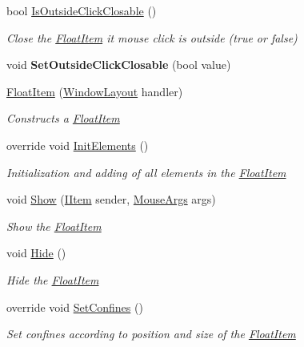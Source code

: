\begin{DoxyCompactItemize}
\item 
bool \mbox{\hyperlink{class_space_v_i_l_1_1_float_item_a491aaaddc768c4676ecfb5c7405ec167}{Is\+Outside\+Click\+Closable}} ()
\begin{DoxyCompactList}\small\item\em Close the \mbox{\hyperlink{class_space_v_i_l_1_1_float_item}{Float\+Item}} it mouse click is outside (true or false) \end{DoxyCompactList}\item 
\mbox{\label{class_space_v_i_l_1_1_float_item_a1e7c8a8d2ba5875d5bc9713a35ea4d36}} 
void {\bfseries Set\+Outside\+Click\+Closable} (bool value)
\item 
\mbox{\hyperlink{class_space_v_i_l_1_1_float_item_af80858fea5cd334aeea694ad34f9e9e6}{Float\+Item}} (\mbox{\hyperlink{class_space_v_i_l_1_1_window_layout}{Window\+Layout}} handler)
\begin{DoxyCompactList}\small\item\em Constructs a \mbox{\hyperlink{class_space_v_i_l_1_1_float_item}{Float\+Item}} \end{DoxyCompactList}\item 
override void \mbox{\hyperlink{class_space_v_i_l_1_1_float_item_adf2e88b89c3ce9ec105fae8ac66390e4}{Init\+Elements}} ()
\begin{DoxyCompactList}\small\item\em Initialization and adding of all elements in the \mbox{\hyperlink{class_space_v_i_l_1_1_float_item}{Float\+Item}} \end{DoxyCompactList}\item 
void \mbox{\hyperlink{class_space_v_i_l_1_1_float_item_a7b352daad024029b2816939c0736aa66}{Show}} (\mbox{\hyperlink{interface_space_v_i_l_1_1_core_1_1_i_item}{I\+Item}} sender, \mbox{\hyperlink{class_space_v_i_l_1_1_core_1_1_mouse_args}{Mouse\+Args}} args)
\begin{DoxyCompactList}\small\item\em Show the \mbox{\hyperlink{class_space_v_i_l_1_1_float_item}{Float\+Item}} \end{DoxyCompactList}\item 
void \mbox{\hyperlink{class_space_v_i_l_1_1_float_item_a7087e7124eae00d372a68b9966a2548d}{Hide}} ()
\begin{DoxyCompactList}\small\item\em Hide the \mbox{\hyperlink{class_space_v_i_l_1_1_float_item}{Float\+Item}} \end{DoxyCompactList}\item 
override void \mbox{\hyperlink{class_space_v_i_l_1_1_float_item_ada12a95045db04f1a5e196a14f1a8d0f}{Set\+Confines}} ()
\begin{DoxyCompactList}\small\item\em Set confines according to position and size of the \mbox{\hyperlink{class_space_v_i_l_1_1_float_item}{Float\+Item}} \end{DoxyCompactList}\end{DoxyCompactItemize}
